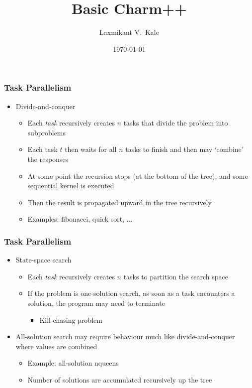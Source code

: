 \documentclass{beamer}
\title{Basic Charm++}
\subtitle{}
\author[Laxmikant V.~Kale]{
Laxmikant V.~Kale
}
\date{\today}
\begin{document}
\begin{frame}[fragile]
  \frametitle{Task Parallelism}
  \begin{itemize}
    \item Divide-and-conquer
      \begin{itemize}
      \item Each \textit{task} recursively creates $n$ tasks that divide the
        problem into subproblems
      \item Each task $t$ then waits for all $n$ tasks to finish and then may
        `combine' the responses
      \item At some point the recursion stops (at the bottom of the tree), and
        some sequential kernel is executed
      \item Then the result is propagated upward in the tree recursively
      \item Examples: fibonacci, quick sort, $\ldots$
      \end{itemize}
  \end{itemize}
\end{frame}


\begin{frame}[fragile]
  \frametitle{Task Parallelism}
  \begin{itemize}
    \item State-space search
      \begin{itemize}
      \item Each \textit{task} recursively creates $n$ tasks to partition the
        search space
      \item If the problem is one-solution search, as soon as a task encounters
        a solution, the program may need to terminate
        \begin{itemize}
          \item Kill-chasing problem
        \end{itemize}
      \end{itemize}
      \item All-solution search may require behaviour much like
        divide-and-conquer where values are combined
        \begin{itemize}
        \item Example: all-solution nqueens
        \item Number of solutions are accumulated recursively up the tree
        \end{itemize}
  \end{itemize}
\end{frame}
\end{document}
